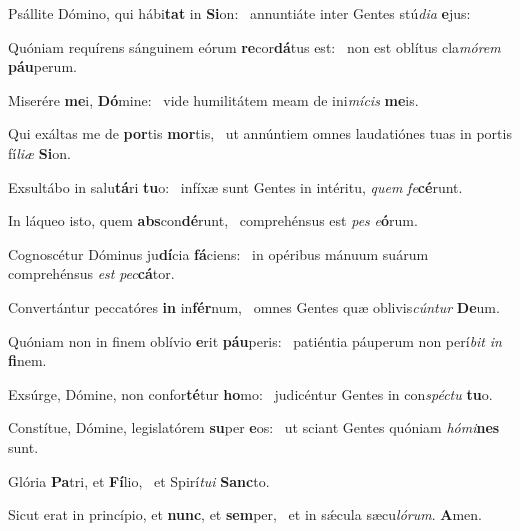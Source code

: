 \item Psállite Dómino, qui hábi\textbf{tat} in \textbf{Si}on:~\psstar{} annuntiáte inter Gentes stú\textit{dia} \textbf{e}jus:
\item Quóniam requírens sánguinem eórum \textbf{re}cor\textbf{dá}tus est:~\psstar{} non est oblítus cla\textit{mórem} \textbf{páu}perum.
\item Miserére \textbf{me}i, \textbf{Dó}mine:~\psstar{} vide humilitátem meam de ini\textit{mícis} \textbf{me}is.
\item Qui exáltas me de \textbf{por}tis \textbf{mor}tis,~\psstar{} ut annúntiem omnes laudatiónes tuas in portis fí\textit{liæ} \textbf{Si}on.
\item Exsultábo in salu\textbf{tá}ri \textbf{tu}o:~\psstar{} infíxæ sunt Gentes in intéritu, \textit{quem} \textit{fe}\textbf{cé}runt.
\item In láqueo isto, quem \textbf{abs}con\textbf{dé}runt,~\psstar{} comprehénsus est \textit{pes} \textit{e}\textbf{ó}rum.
\item Cognoscétur Dóminus ju\textbf{dí}cia \textbf{fá}ciens:~\psstar{} in opéribus mánuum suárum comprehénsus \textit{est} \textit{pec}\textbf{cá}tor.
\item Convertántur peccatóres \textbf{in} in\textbf{fér}num,~\psstar{} omnes Gentes quæ oblivis\textit{cúntur} \textbf{De}um.
\item Quóniam non in finem oblívio \textbf{e}rit \textbf{páu}peris:~\psstar{} patiéntia páuperum non perí\textit{bit} \textit{in} \textbf{fi}nem.
\item Exsúrge, Dómine, non confor\textbf{té}tur \textbf{ho}mo:~\psstar{} judicéntur Gentes in con\textit{spéctu} \textbf{tu}o.
\item Constítue, Dómine, legislatórem \textbf{su}per \textbf{e}os:~\psstar{} ut sciant Gentes quóniam \textit{hómi}\textbf{nes} sunt.
\item Glória \textbf{Pa}tri, et \textbf{Fí}lio,~\psstar{} et Spirí\textit{tui} \textbf{Sanc}to.
\item Sicut erat in princípio, et \textbf{nunc}, et \textbf{sem}per,~\psstar{} et in sǽcula sæcu\textit{lórum}. \textbf{A}men.
